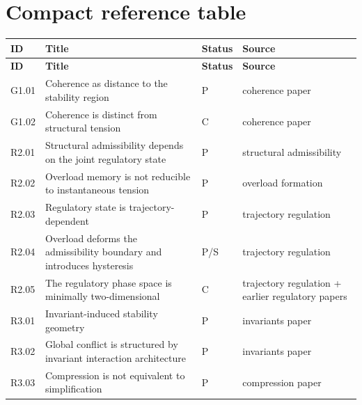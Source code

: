 \documentclass[12pt]{article}
\begin{document}
	\section{Compact reference table}
	
	\begin{longtable}{>{\RaggedRight\arraybackslash}p{}
			>{\RaggedRight\arraybackslash}p{}
			>{\RaggedRight\arraybackslash}p{}
			>{\RaggedRight\arraybackslash}p{}}
		\toprule
		\textbf{ID} & \textbf{Title} & \textbf{Status} & \textbf{Source} \\
		\midrule
		\endfirsthead
		\toprule
		\textbf{ID} & \textbf{Title} & \textbf{Status} & \textbf{Source} \\
		\midrule
		\endhead
		
		G1.01 & Coherence as distance to the stability region & P & coherence paper \\
		
		G1.02 & Coherence is distinct from structural tension & C & coherence paper \\
		
		R2.01 & Structural admissibility depends on the joint regulatory state & P & structural admissibility \\
		
		R2.02 & Overload memory is not reducible to instantaneous tension & P & overload formation \\
		
		R2.03 & Regulatory state is trajectory-dependent & P & trajectory regulation \\
		
		R2.04 & Overload deforms the admissibility boundary and introduces hysteresis & P/S & trajectory regulation \\
		
		R2.05 & The regulatory phase space is minimally two-dimensional & C & trajectory regulation + earlier regulatory papers \\
		
		R3.01 & Invariant-induced stability geometry & P & invariants paper \\
		
		R3.02 & Global conflict is structured by invariant interaction architecture & P & invariants paper \\
		
		R3.03 & Compression is not equivalent to simplification & P & compression paper \\
		

\end{longtable}
\end{document}
